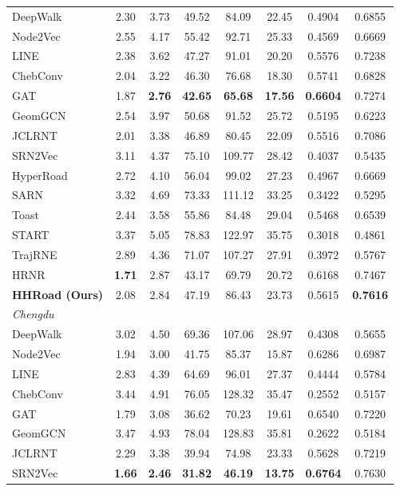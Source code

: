 \begin{table}[t]
{\begin{tabular}{l|cc|ccc|cc}
\midrule
DeepWalk & 2.30 & 3.73 & 49.52 & 84.09 & 22.45 & 0.4904 & 0.6855 \\
Node2Vec & 2.55 & 4.17 & 55.42 & 92.71 & 25.33 & 0.4569 & 0.6669 \\
LINE & 2.38 & 3.62 & 47.27 & 91.01 & 20.20 & 0.5576 & 0.7238 \\
ChebConv & 2.04 & 3.22 & 46.30 & 76.68 & 18.30 & 0.5741 & 0.6828 \\
GAT & 1.87 & \textbf{2.76} & \textbf{42.65} & \textbf{65.68} & \textbf{17.56} & \textbf{0.6604} & 0.7274 \\
GeomGCN & 2.54 & 3.97 & 50.68 & 91.52 & 25.72 & 0.5195 & 0.6223 \\
JCLRNT & 2.01 & 3.38 & 46.89 & 80.45 & 22.09 & 0.5516 & 0.7086 \\
SRN2Vec & 3.11 & 4.37 & 75.10 & 109.77 & 28.42 & 0.4037 & 0.5435 \\
HyperRoad & 2.72 & 4.10 & 56.04 & 99.02 & 27.23 & 0.4967 & 0.6669 \\
SARN & 3.32 & 4.69 & 73.33 & 111.12 & 33.25 & 0.3422 & 0.5295 \\
Toast & 2.44 & 3.58 & 55.86 & 84.48 & 29.04 & 0.5468 & 0.6539 \\
START & 3.37 & 5.05 & 78.83 & 122.97 & 35.75 & 0.3018 & 0.4861 \\
TrajRNE & 2.89 & 4.36 & 71.07 & 107.27 & 27.91 & 0.3972 & 0.5767 \\
HRNR & \textbf{1.71} & 2.87 & 43.17 & 69.79 & 20.72 & 0.6168 & 0.7467 \\
\textbf{HHRoad (Ours)} & 2.08 & 2.84 & 47.19 & 86.43 & 23.73 & 0.5615 & \textbf{0.7616} \\
\midrule
\multicolumn{8}{l}{\textit{Chengdu}} \\
\midrule
DeepWalk & 3.02 & 4.50 & 69.36 & 107.06 & 28.97 & 0.4308 & 0.5655 \\
Node2Vec & 1.94 & 3.00 & 41.75 & 85.37 & 15.87 & 0.6286 & 0.6987 \\
LINE & 2.83 & 4.39 & 64.69 & 96.01 & 27.37 & 0.4444 & 0.5784 \\
ChebConv & 3.44 & 4.91 & 76.05 & 128.32 & 35.47 & 0.2552 & 0.5157 \\
GAT & 1.79 & 3.08 & 36.62 & 70.23 & 19.61 & 0.6540 & 0.7220 \\
GeomGCN & 3.47 & 4.93 & 78.04 & 128.83 & 35.81 & 0.2622 & 0.5184 \\
JCLRNT & 2.29 & 3.38 & 39.94 & 74.98 & 23.33 & 0.5628 & 0.7219 \\
SRN2Vec & \textbf{1.66} & \textbf{2.46} & \textbf{31.82} & \textbf{46.19} & \textbf{13.75} & \textbf{0.6764} & 0.7630 \\

\end{tabular}}
\end{table}
